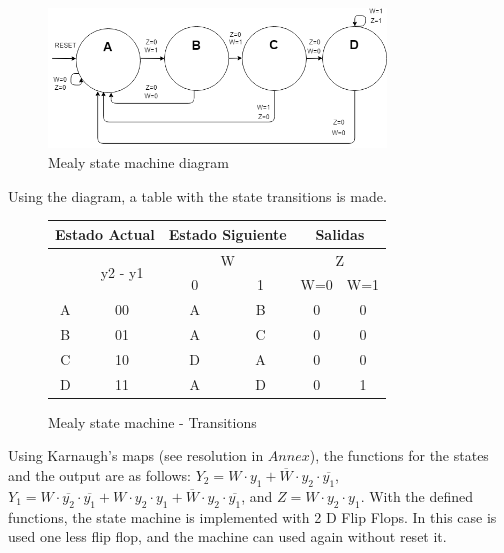 \begin{figure}[H]
    \begin{centering}
    \includegraphics[width=0.8\textwidth]{Graficos2/2b_fsm.png}
    \par\end{centering}
    \caption{Mealy state machine diagram}
\end{figure}
\newpage
Using the diagram, a table with the state 
transitions is made.
\begin{figure}[H]
    \begin{center}
\begin{tabular}{|c|c|c|c||c|c|}
    \hline 
    \multicolumn{2}{|c|}{Estado Actual} & \multicolumn{2}{c||}{Estado Siguiente} & \multicolumn{2}{c|}{Salidas}\tabularnewline
    \hline 
    \hline 
    \multirow{2}{*}{} & \multirow{2}{*}{y2 - y1} & \multicolumn{2}{c||}{W} & \multicolumn{2}{c|}{Z}\tabularnewline
    \cline{3-6} 
     &  & \multicolumn{1}{c|}{0} & \multicolumn{1}{c||}{1} & W=0 & W=1\tabularnewline
    \hline 
    A & 00 & A & B & 0 & 0\tabularnewline
    \hline 
    B & 01 & A & C & 0 & 0\tabularnewline
    \hline 
    C & 10 & D & A & 0 & 0\tabularnewline
    \hline 
    D & 11 & A & D & 0 & 1\tabularnewline
    \hline 
    \end{tabular}
    \caption{Mealy state machine - Transitions}
\end{center}
\end{figure}

Using Karnaugh's maps (see resolution in $Annex$), the functions for the 
states and the output are as follows: $Y_2 = W \cdot y_1 + \overline{W} \cdot y_2 \cdot \overline{y_1}$, $Y_1 = W \cdot \overline{y_2} \cdot \overline{y_1} + W \cdot y_2 \cdot y_1 + \overline{W} \cdot y_2 \cdot \overline{y_1}$, 
and $Z = W \cdot y_2 \cdot y_1$.
With the defined functions, the state machine 
is implemented with 2 D Flip Flops. In this case
is used one less flip flop, and the machine can
used again without reset it.

